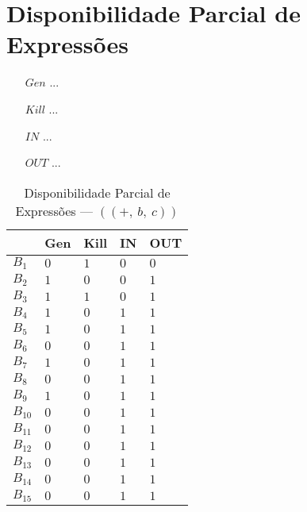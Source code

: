 \section{Disponibilidade Parcial de Express\~oes}

\begin{itemize}
  \item[$Gen$] ...
  \item[$Kill$] ...
  \item[$IN$] ...
  \item[$OUT$] ...
\end{itemize}

\begin{table}[ht]
\centering
\begin{tabular}{l|l|l|l|l}
	& Gen & Kill & IN & OUT\\
\hline
$B_{1}$ &  $0$ & $1$ & $0$ & $0$\\
$B_{2}$ &  $1$ & $0$ & $0$ & $1$\\
$B_{3}$ &  $1$ & $1$ & $0$ & $1$\\
$B_{4}$ &  $1$ & $0$ & $1$ & $1$\\
$B_{5}$ &  $1$ & $0$ & $1$ & $1$\\
$B_{6}$ &  $0$ & $0$ & $1$ & $1$\\
$B_{7}$ &  $1$ & $0$ & $1$ & $1$\\
$B_{8}$ &  $0$ & $0$ & $1$ & $1$\\
$B_{9}$ &  $1$ & $0$ & $1$ & $1$\\
$B_{10}$ &  $0$ & $0$ & $1$ & $1$\\
$B_{11}$ &  $0$ & $0$ & $1$ & $1$\\
$B_{12}$ &  $0$ & $0$ & $1$ & $1$\\
$B_{13}$ &  $0$ & $0$ & $1$ & $1$\\
$B_{14}$ &  $0$ & $0$ & $1$ & $1$\\
$B_{15}$ &  $0$ & $0$ & $1$ & $1$\\
\end{tabular}
\caption{Disponibilidade Parcial de Express\~oes --- $((+,\:b,\:c))$}
\end{table}

